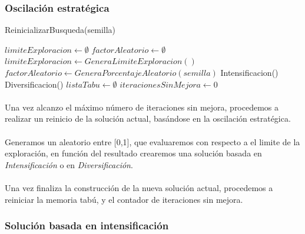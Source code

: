 \documentclass{article}
\begin{document}
	\subsubsection{Oscilación estratégica}
	
	
	\begin{algorithm}[H]
		\caption{ReinicializarBusqueda(semilla)}
		\begin{algorithmic}
			\STATE $limiteExploracion \leftarrow \emptyset$
			\STATE $factorAleatorio \leftarrow \emptyset$
			\STATE $limiteExploracion \leftarrow GeneraLimiteExploracion()$
			\STATE $factorAleatorio \leftarrow GeneraPorcentajeAleatorio(semilla)$
			\STATE Intensificacion()
			\ELSE
			\STATE Diversificacion()
			\ENDIF
			\STATE $listaTabu \leftarrow \emptyset$
			\STATE $iteracionesSinMejora \leftarrow 0$
		\end{algorithmic}
	\end{algorithm}
	
	
	\paragraph{}Una vez alcanzo el máximo número de iteraciones sin mejora, procedemos a realizar un reinicio de la solución actual, basándose en la oscilación estratégica.
	
	\paragraph{}Generamos un aleatorio entre [0,1], que evaluaremos con respecto a el limite de la exploración, en función del resultado crearemos una solución basada en \emph{Intensificación} o en \emph{Diversificación}.
	
	\paragraph{}Una vez finaliza la construcción de la nueva solución actual, procedemos a reiniciar la memoria tabú, y el contador de iteraciones sin mejora.
	
	\subsubsection{Solución basada en intensificación}
	
\end{document}
